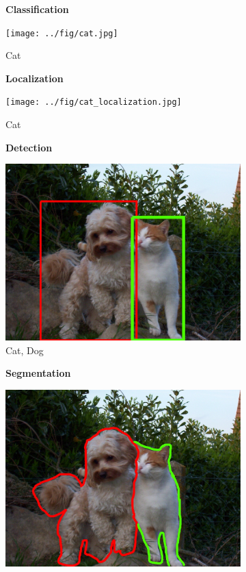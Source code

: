 \begin{figure}[h]
  \begin{subfigure}[b]{0.245\textwidth}
    \centering
    \textbf{Classification}\par\medskip
    \texttt{[image: ../fig/cat.jpg]}
    \caption{Cat}
    \label{fig:CatOne}
  \end{subfigure}
  \begin{subfigure}[b]{0.245\textwidth}
    \centering
    \textbf{Localization}\par\medskip
    \texttt{[image: ../fig/cat\_localization.jpg]}
    \caption{Cat}
    \label{fig:CatTwo}
  \end{subfigure}
 \begin{subfigure}[b]{0.245\textwidth}
   \centering
   \textbf{Detection}\par\medskip
    \includegraphics[width=\textwidth]{../fig/cat_dog_detection.jpg}
    \caption{Cat, Dog}
    \label{fig:CatDogOne}
  \end{subfigure}
  \begin{subfigure}[b]{0.245\textwidth}
    \centering
    \textbf{Segmentation}\par\medskip
     \includegraphics[width=\textwidth]{../fig/cat_dog_segmentation.jpg}

\end{subfigure}
\end{figure}
